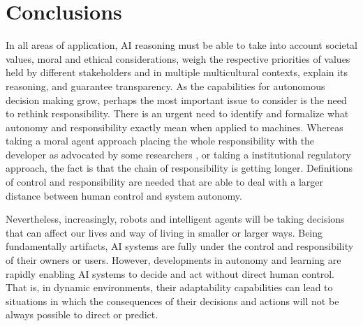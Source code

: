 \documentclass[twocolumn]{article}
\begin{document}
\section{Conclusions}\label{sec:conclusions}
In all areas of application, AI reasoning must be able to take into account societal values, moral and ethical considerations, weigh the respective priorities of values held by different stakeholders and in multiple multicultural contexts, explain its reasoning, and guarantee transparency. As the capabilities for autonomous decision making grow, perhaps the most important issue to consider is the need to rethink responsibility. %
There is an urgent need to identify and formalize what autonomy and responsibility exactly mean when applied to machines. Whereas taking a moral agent approach 
placing the whole responsibility with the developer as advocated by some researchers \cite{bryson2011just}, or taking a institutional regulatory approach, the fact is that the chain of responsibility is getting longer. Definitions of control and responsibility are needed that are able to deal with a larger distance between human control and system autonomy.

Nevertheless, increasingly, robots and intelligent agents will be taking decisions that can affect our lives and way of living in smaller or larger ways. Being fundamentally artifacts, AI systems are fully under the control and responsibility of their owners  or users. However,  developments in autonomy and learning are rapidly enabling AI systems to decide and act without direct human control. That is,
in dynamic environments, their adaptability capabilities can lead to situations in which the consequences of their decisions and actions will not be always possible to direct or predict.

\end{document}
